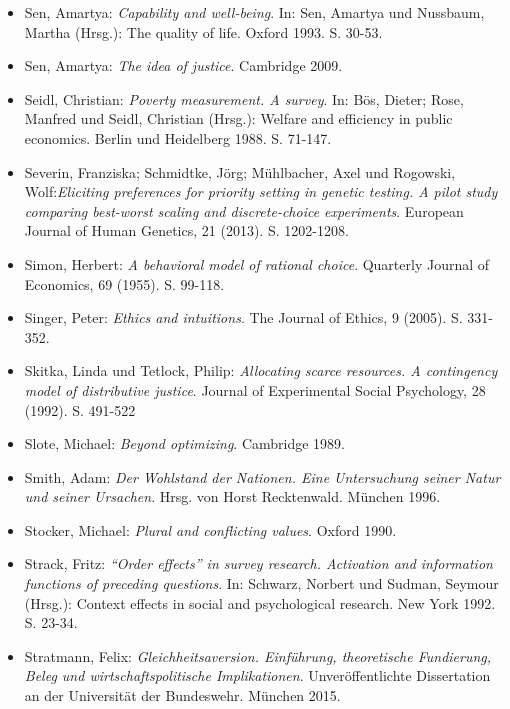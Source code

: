 \documentclass[a4paper]{thesis}
\begin{document}
\begin{itemize}[leftmargin=1.5em,label={},itemindent=-1.5em, itemsep=-1ex]
\item Sen, Amartya: \textit{Capability and well-being}. In: Sen, Amartya und Nussbaum, Martha (Hrsg.): The quality of life. Oxford 1993. S. 30-53.

\item Sen, Amartya: \textit{The idea of justice}. Cambridge 2009.

\item Seidl, Christian: \textit{Poverty measurement. A survey}. In: Bös, Dieter; Rose, Manfred und Seidl, Christian (Hrsg.): Welfare and efficiency in public economics. Berlin und Heidelberg 1988. S. 71-147.

\item Severin, Franziska; Schmidtke, Jörg; Mühlbacher, Axel und Rogowski, Wolf:\textit{Eliciting preferences for priority setting in genetic testing. A pilot study comparing best-worst scaling and discrete-choice experiments}. European Journal of Human Genetics, 21 (2013). S. 1202-1208.

\item Simon, Herbert: \textit{A behavioral model of rational choice}. Quarterly Journal of Economics, 69 (1955). S. 99-118.

\item Singer, Peter: \textit{Ethics and intuitions}. The Journal of Ethics, 9 (2005). S. 331-352.

\item Skitka, Linda und Tetlock, Philip: \textit{Allocating scarce resources. A contingency model of distributive justice}. Journal of Experimental Social Psychology, 28 (1992). S. 491-522

\item Slote, Michael: \textit{Beyond optimizing}. Cambridge 1989.

\item Smith, Adam: \textit{Der Wohlstand der Nationen. Eine Untersuchung seiner Natur und seiner Ursachen}. Hrsg. von Horst Recktenwald. München 1996.

\item Stocker, Michael: \textit{Plural and conflicting values}. Oxford 1990.

\item Strack, Fritz: \textit{\enquote{Order effects} in survey research. Activation and information functions of preceding questions}. In: Schwarz, Norbert und Sudman, Seymour (Hrsg.): Context effects in social and psychological research. New York 1992. S. 23-34.

\item Stratmann, Felix: \textit{Gleichheitsaversion. Einführung, theoretische Fundierung, Beleg und wirtschaftspolitische Implikationen}. Unveröffentlichte Dissertation an der Universität der Bundeswehr. München 2015.


\end{itemize}
\end{document}
